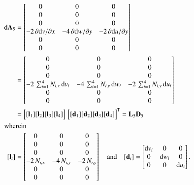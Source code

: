 \begin{subequations}
	\begin{align}
		\mathrm{d} \mathbf{A}_5 & =  \begin{bmatrix}
			0 & 0 &  0   \\
			0 &  0 & 0  \\
			0 &  0 & 0 \\
			- 2 \, \partial \mathrm{d} v / \partial x & - 4 \, \partial \mathrm{d} w / \partial y & - 2 \, \partial \mathrm{d} u / \partial y  \\
			0 &  0 & 0  \\
			0 &  0 & 0  \end{bmatrix} \notag\\
		& = \begin{bmatrix}
			0 & 0 &  0   \\
			0 &  0 & 0  \\
			0 &  0 & 0 \\
			- 2 \, \sum\nolimits_{i=1}^4 N_{i,x} \, \mathrm{d} v_i  & - 4 \, \sum\nolimits_{i=1}^4 N_{i,y} \, \mathrm{d} w_i  & - 2 \, \sum\nolimits_{i=1}^4 N_{i,y} \, \mathrm{d} u_i   \\
			0 &  0 & 0  \\
			0 &  0 & 0  \end{bmatrix} \notag \\	
		& = \begin{bmatrix}
			[\mathbf{l}_1] [\mathbf{l}_2] [\mathbf{l}_3] [\mathbf{l}_4] 
		\end{bmatrix}  \, \begin{bmatrix} [\mathbf{d}_1] [\mathbf{d}_2] [\mathbf{d}_3] [\mathbf{d}_4] \end{bmatrix}^{\mathsf{T}}
	= \mathbf{L}_5 \mathbf{D}_5 \\
		\intertext{wherein}
		[\mathbf{l}_i] & = \begin{bmatrix}
			0 & 0 &  0   \\
			0 &  0 & 0  \\
			0 &  0 & 0 \\
			- 2 \, N_{i,x}  & - 4 \,  N_{i,y}  & - 2 \, N_{i,y}  \\
			0 &  0 & 0  \\
			0 &  0 & 0  \end{bmatrix}    \quad \text{and} \quad	[\mathbf{d}_i] = \begin{bmatrix}
			\mathrm{d} v_i & 0  & 0  \\
			0 &  \mathrm{d} w_i   & 0  \\
			0 & 0 & \mathrm{d} u_i \end{bmatrix} .
	\end{align}
\end{subequations}

